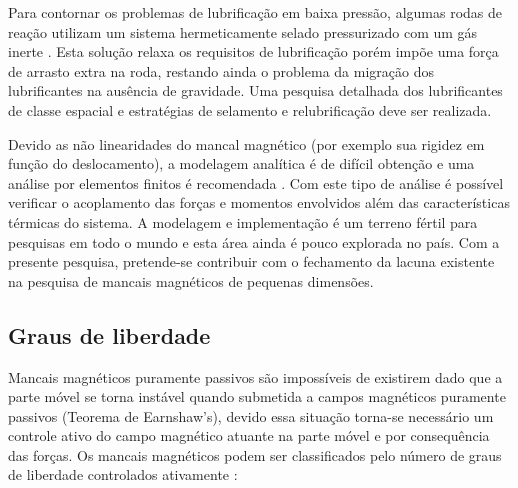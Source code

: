 Para contornar os problemas de lubrificação em baixa pressão, algumas rodas de reação  utilizam um sistema hermeticamente selado pressurizado com um gás inerte \citep{Krishnan2010}. Esta solução relaxa os requisitos de lubrificação porém impõe uma força de arrasto extra na roda, restando ainda o problema da migração dos lubrificantes na ausência de gravidade. Uma pesquisa detalhada dos lubrificantes de classe espacial e estratégias de selamento e relubrificação deve ser realizada.

	
Devido as não linearidades do mancal magnético (por exemplo sua rigidez em função do deslocamento), a modelagem analítica é de difícil obtenção e uma análise por elementos finitos é recomendada \citep{pilat2007automatic}. Com este tipo de análise é possível verificar o acoplamento das forças e momentos envolvidos além das características térmicas do sistema. A modelagem e implementação é um terreno fértil para pesquisas em todo o mundo e  esta área ainda é pouco explorada no país. Com a presente pesquisa, pretende-se contribuir com o fechamento da lacuna existente na pesquisa de mancais magnéticos de pequenas dimensões.

\subsection{Graus de liberdade}

Mancais magnéticos puramente passivos são impossíveis de existirem dado que a parte móvel se torna instável quando submetida a campos magnéticos puramente passivos (Teorema de Earnshaw's), devido essa situação torna-se necessário um controle ativo do campo magnético atuante na parte móvel e por consequência das forças. Os mancais magnéticos podem ser classificados pelo número de graus de liberdade controlados ativamente \citep{Schweitzer2009}:

